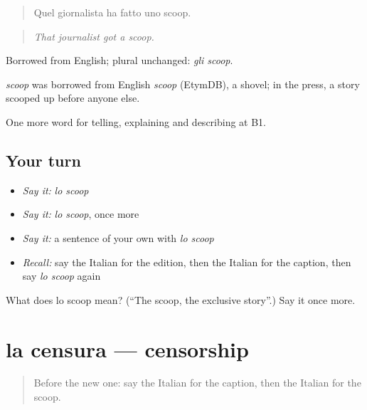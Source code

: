 \begin{quote}
Quel giornalista ha fatto uno scoop.
\end{quote}

\begin{quote}
\emph{That journalist got a scoop.}
\end{quote}

Borrowed from English; plural unchanged: \emph{gli scoop}.

\begin{cousinweb}
\emph{scoop} was borrowed from English \emph{scoop} (EtymDB), a shovel; in the press, a story scooped up before anyone else.
\end{cousinweb}

\begin{grammarlens}[title={What you've built}]
One more word for telling, explaining and describing at B1.
\end{grammarlens}

\subsection*{Your turn}
\begin{itemize}
\raggedright
  \item \emph{Say it:} \emph{lo scoop}
  \item \emph{Say it:} \emph{lo scoop}, once more
  \item \emph{Say it:} a sentence of your own with \emph{lo scoop}
  \item \emph{Recall:} say the Italian for the edition, then the Italian for the caption, then say \emph{lo scoop} again
\end{itemize}

\begin{tcolorbox}[breakable,colback=teal!4,colframe=teal!35!black,title={Before you move on}]
What does lo scoop mean? (\textquotedblleft{}The scoop, the exclusive story\textquotedblright{}.) Say it once more.
\end{tcolorbox}
\section[la censura]{la censura — censorship}

\label{lesson:IT-C286-censura}



\begin{quote}
Before the new one: say the Italian for the caption, then the Italian for the scoop.
\end{quote}

